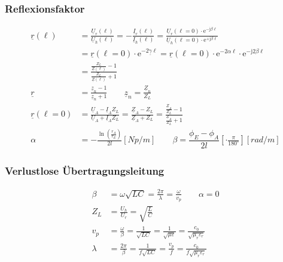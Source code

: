 \subsubsection{Reflexionsfaktor}
\begin{align*}
    \underline{r}(\ell)     & = \frac{\underline{U}_r(\ell)}{\underline{U}_h(\ell)} = -\frac{\underline{I}_r(\ell)}{\underline{I}_h(\ell)} = \frac{\underline{U}_r(\ell=0) \cdot \mathrm{e}^{-\mathrm{j} \beta \ell}}{\underline{U}_h(\ell=0) \cdot \mathrm{e}^{+\mathrm{j} \beta \ell}} \\
                            & = \underline{r}(\ell=0) \cdot \mathrm{e}^{-2 \underline{\gamma} \ell}=\underline{r}(\ell=0) \cdot \mathrm{e}^{-2 \alpha \ell} \cdot \mathrm{e}^{-\mathrm{j} 2 \beta \ell}\\
                            & = \frac{\frac{Z_L}{\underline{Z}(\ell)}-1}{\frac{Z_L}{\underline{Z}(\ell)}+1} \\
    \underline{r}           & = \frac{\underline{z}_n-1}{\underline{z}_n+1} \qquad              \underline{z}_n=\frac{\underline{Z}_n}{Z_L}\\
    \underline{r}(\ell = 0) & = \frac{\underline{U}_A-\underline{I}_A Z_L}{\underline{U}_A + \underline{I}_A Z_L}=\frac{\underline{Z}_A-Z_L}{\underline{Z}_A+Z_L}=\frac{\frac{\underline{Z}_A}{Z_L}-1}{\frac{\underline{Z}_A}{Z_L}+1}\\
                    \alpha  & = -\frac{\ln(\frac{r_A}{r_E})}{2l} [\si{Np/m}]  \qquad  \beta = \dfrac{\phi_E -\phi_A}{2l} \left[\cdot\frac{\pi}{180^\circ}\right] [\si{rad/m}]
\end{align*}

\subsubsection{Verlustlose Übertragungsleitung }
\begin{align*}
    \beta              & = \omega\sqrt{LC} = \frac{2 \pi}{\lambda} = \frac{\omega}{v_p}\qquad \alpha = 0 \\
    Z_L                & =\frac{U_h}{U_r}       = \sqrt{\frac{L}{C}}                                                                          \\
    v_p                & = \frac{\omega}{\beta} = \frac{1}{\sqrt{LC}}= \frac{1}{\sqrt{\mu\varepsilon}}= \frac{c_0}{\sqrt{\mu_r\varepsilon_r}} \\
    \lambda            & = \frac{2\pi}{\beta}=\frac{1}{f\sqrt{LC}}= \frac{v_p}{f}= \frac{c_0}{f\sqrt{\mu_r\varepsilon_r}}
\end{align*}


